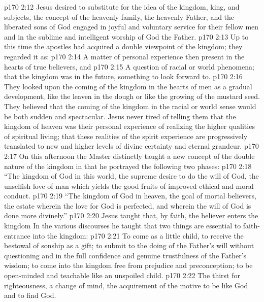 \vs p170 2:12 Jesus desired to substitute for the idea of the kingdom, king, and subjects, the concept of the heavenly family, the heavenly Father, and the liberated sons of God engaged in joyful and voluntary service for their fellow men and in the sublime and intelligent worship of God the Father.
\vs p170 2:13 Up to this time the apostles had acquired a double viewpoint of the kingdom; they regarded it as:
\pc \vs p170 2:14 \bibnobreakspace A matter of personal experience then present in the hearts of true believers, and
\vs p170 2:15 \bibnobreakspace A question of racial or world phenomena; that the kingdom was in the future, something to look forward to.
\pc \vs p170 2:16 They looked upon the coming of the kingdom in the hearts of men as a gradual development, like the leaven in the dough or like the growing of the mustard seed. They believed that the coming of the kingdom in the racial or world sense would be both sudden and spectacular. Jesus never tired of telling them that the kingdom of heaven was their personal experience of realizing the higher qualities of spiritual living; that these realities of the spirit experience are progressively translated to new and higher levels of divine certainty and eternal grandeur.
\vs p170 2:17 On this afternoon the Master distinctly taught a new concept of the double nature of the kingdom in that he portrayed the following two phases:
\vs p170 2:18 \textcolor{ubdarkred}{“\bibnobreakspace The kingdom of God in this world, the supreme desire to do the will of God, the unselfish love of man which yields the good fruits of improved ethical and moral conduct.}
\vs p170 2:19 \textcolor{ubdarkred}{“\bibnobreakspace The kingdom of God in heaven, the goal of mortal believers, the estate wherein the love for God is perfected, and wherein the will of God is done more divinely.”}
\vs p170 2:20 Jesus taught that, by faith, the believer enters the kingdom  In the various discourses he taught that two things are essential to faith\hyp{}entrance into the kingdom:
\pc \vs p170 2:21 \bibnobreakspace {} To come as a little child, to receive the bestowal of sonship as a gift; to submit to the doing of the Father’s will without questioning and in the full confidence and genuine trustfulness of the Father’s wisdom; to come into the kingdom free from prejudice and preconception; to be open\hyp{}minded and teachable like an unspoiled child.
\pc \vs p170 2:22 \bibnobreakspace {} The thirst for righteousness, a change of mind, the acquirement of the motive to be like God and to find God.
